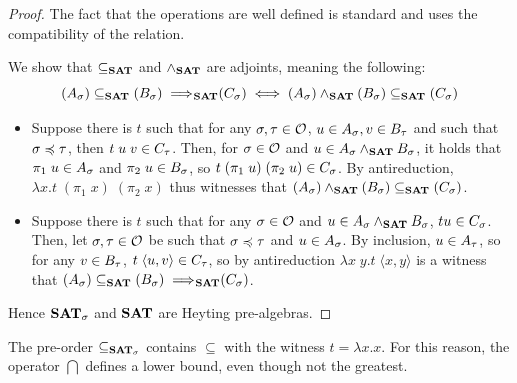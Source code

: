 \documentclass[a4paper,UKenglish,cleveref, autoref, thm-restate]{lipics-v2021}
\begin{document}
\begin{proof}
The fact that the operations are well defined is standard and uses the compatibility of the relation.


  We show that $\subseteq_{{\mathbf{SAT}}}$ and $\land_{{\mathbf{SAT}}}$ are adjoints, meaning the following:
  \[(A_\sigma) \subseteq_{{\mathbf{SAT}}} (B_\sigma) \implies\!\!\!_{{\mathbf{SAT}}} (C_\sigma) \iff (A_\sigma)\land_{{\mathbf{SAT}}} (B_\sigma)\subseteq_{{\mathbf{SAT}}} (C_\sigma)\]
  \begin{itemize}
  \item Suppose there is $t$ such that for any $\sigma,\tau\in\mathcal O$, $u \in A_{\sigma}, v \in B_{\tau}$ and such that $\sigma \preccurlyeq \tau$, then $t\;u\;v \in C_{\tau}$. Then, for $\sigma \in \mathcal O$ and $u \in A_{\sigma}\land_{{\mathbf{SAT}}}B_{\sigma}$, it holds that $\pi_1\;u\in A_{\sigma}$ and $\pi_2\;u\in B_{\sigma}$, so $t\;(\pi_1\;u)\;(\pi_2\;u)\in C_{\sigma}$. By antireduction, $\lambda x.t\;(\pi_1\;x)\;(\pi_2\;x)$ thus witnesses that $(A_\sigma) \land_{{\mathbf{SAT}}} (B_\sigma) \subseteq_{{\mathbf{SAT}}} (C_\sigma)$.
  \item Suppose there is $t$ such that for any $\sigma\in\mathcal O$ and $u \in A_{\sigma} \land_{{\mathbf{SAT}}} B_{\sigma}$, $tu \in C_{\sigma}$. Then, let $\sigma,\tau\in\mathcal O$ be such that $\sigma\preccurlyeq \tau$ and $u \in A_{\sigma}$. By inclusion, $u \in A_{\tau}$, so for any $v \in B_{\tau}$, $t\;\langle u,v\rangle \in C_{\tau}$, so by antireduction $\lambda x\;y.t\;\langle x,y\rangle$ is a witness that \mbox{$(A_\sigma)\subseteq_{{\mathbf{SAT}}} (B_\sigma) \implies\!\!\!_{{\mathbf{SAT}}} (C_\sigma)$}.
  \end{itemize}
  Hence ${\mathbf{SAT}}_{\sigma}$ and ${\mathbf{SAT}}$ are Heyting pre-algebras.
\end{proof}

\begin{remark}\label{rmk:inclusion}
  The pre-order $\subseteq_{{\mathbf{SAT}}_{\sigma}}$ contains $\subseteq$ with the witness $t = \lambda x.x$. For this reason, the operator $\bigcap$ defines a lower bound, even though not the greatest.
\end{remark}
\end{document}
